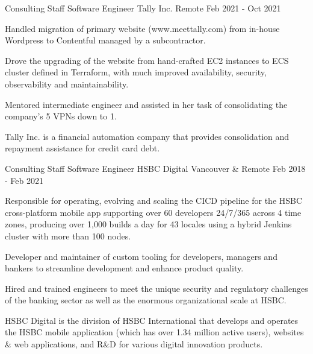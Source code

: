 \begin{cventries}
  \cventrywithsummary
    {Consulting Staff Software Engineer} %
    {Tally Inc.} %
    {Remote} %
    {Feb 2021 - Oct 2021} %
    {
      \begin{cvitems} %
        \item {Handled migration of primary website (www.meettally.com) from in-house Wordpress to Contentful managed by a subcontractor.}
        \item {Drove the upgrading of the website from hand-crafted EC2 instances to ECS cluster defined in Terraform, with much improved availability, security, observability and maintainability.}
        \item {Mentored intermediate engineer and assisted in her task of consolidating the company's 5 VPNs down to 1.}
      \end{cvitems}
    }
    {
      Tally Inc. is a financial automation company that provides consolidation and repayment assistance for credit card debt.
    }

  \cventrywithsummary
    {Consulting Staff Software Engineer} %
    {HSBC Digital} %
    {Vancouver \& Remote} %
    {Feb 2018 - Feb 2021} %
    {
      \begin{cvitems} %
        \item {Responsible for operating, evolving and scaling the CICD pipeline for the HSBC cross-platform mobile app supporting over 60 developers 24/7/365 across 4 time zones, producing over 1,000 builds a day for 43 locales using a hybrid Jenkins cluster with more than 100 nodes.}
        \item {Developer and maintainer of custom tooling for developers, managers and bankers to streamline development and enhance product quality.}
        \item {Hired and trained engineers to meet the unique security and regulatory challenges of the banking sector as well as the enormous organizational scale at HSBC. }
      \end{cvitems}
    }
    {
      HSBC Digital is the division of HSBC International that develops and operates the HSBC mobile application (which has over 1.34 million active users), websites \& web applications, and R\&D for various digital innovation products.
    }


\end{cventries}
